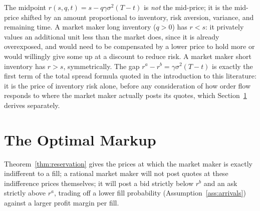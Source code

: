 \documentclass[11pt]{article}
\theoremstyle{remark}
\theoremstyle{definition}
\begin{document}
The midpoint $r(s,q,t)=s-q\gamma\sigma^2(T-t)$ is \emph{not} the mid-price; it is the mid-price shifted by an amount proportional to inventory, risk aversion, variance, and remaining time. A market maker long inventory ($q>0$) has $r<s$: it privately values an additional unit less than the market does, since it is already overexposed, and would need to be compensated by a lower price to hold more or would willingly give some up at a discount to reduce risk. A market maker short inventory has $r>s$, symmetrically. The gap $r^a-r^b=\gamma\sigma^2(T-t)$ is exactly the first term of the total spread formula quoted in the introduction to this literature: it is the price of inventory risk alone, before any consideration of how order flow responds to where the market maker actually posts its quotes, which Section~\ref{sec:markup} derives separately.

\section{The Optimal Markup}
\label{sec:markup}

Theorem~\ref{thm:reservation} gives the prices at which the market maker is exactly indifferent to a fill; a rational market maker will not post quotes at these indifference prices themselves; it will post a bid strictly below $r^b$ and an ask strictly above $r^a$, trading off a lower fill probability (Assumption~\ref{ass:arrivals}) against a larger profit margin per fill.
\end{document}
